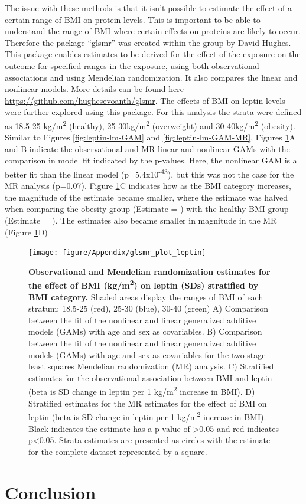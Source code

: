 \documentclass[11pt,twoside]{bristolthesis}
\begin{document}
The issue with these methods is that it isn't possible to estimate the effect of a certain range of BMI on protein levels. This is important to be able to understand the range of BMI where certain effects on proteins are likely to occur. Therefore the package ``glsmr'' was created within the group by David Hughes. This package enables estimates to be derived for the effect of the exposure on the outcome for specified ranges in the exposure, using both observational associations and using Mendelian randomization. It also compares the linear and nonlinear models. More details can be found here \url{https://github.com/hughesevoanth/glsmr}. The effects of BMI on leptin levels were further explored using this package. For this analysis the strata were defined as 18.5-25 kg/m\textsuperscript{2} (healthy), 25-30kg/m\textsuperscript{2} (overweight) and 30-40kg/m\textsuperscript{2} (obesity). Similar to Figures \ref{fig:leptin-lm-GAM} and \ref{fig:leptin-lm-GAM-MR}, Figures \ref{fig:leptin-glsmr}A and B indicate the observational and MR linear and nonlinear GAMs with the comparison in model fit indicated by the p-values. Here, the nonlinear GAM is a better fit than the linear model (p=5.4x10\textsuperscript{-43}), but this was not the case for the MR analysis (p=0.07). Figure \ref{fig:leptin-glsmr}C indicates how as the BMI category increases, the magnitude of the estimate became smaller, where the estimate was halved when comparing the obesity group (Estimate = ) with the healthy BMI group (Estimate = ). The estimates also became smaller in magnitude in the MR (Figure \ref{fig:leptin-glsmr}D)



\begin{figure}
\texttt{[image: figure/Appendix/glsmr\_plot\_leptin]} \caption[Observational and Mendelian randomization estimates for the effect of BMI on leptin stratified by BMI category.]{\textbf{Observational and Mendelian randomization estimates for the effect of BMI (kg/m\textsuperscript{2}) on leptin (SDs) stratified by BMI category.} Shaded areas display the ranges of BMI of each stratum: 18.5-25 (red), 25-30 (blue), 30-40 (green) A) Comparison between the fit of the nonlinear and linear generalized additive models (GAMs) with age and sex as covariables. B) Comparison between the fit of the nonlinear and linear generalized additive models (GAMs) with age and sex as covariables for the two stage least squares Mendelian randomization (MR) analysis. C) Stratified estimates for the observational association between BMI and leptin (beta is SD change in leptin per 1 kg/m\textsuperscript{2} increase in BMI). D) Stratified estimates for the MR estimates for the effect of BMI on leptin (beta is SD change in leptin per 1 kg/m\textsuperscript{2} increase in BMI). Black indicates the estimate has a p value of \textgreater0.05 and red indicates p\textless0.05. Strata estimates are presented as circles with the estimate for the complete dataset represented by a square.}\label{fig:leptin-glsmr}
\end{figure}
\hypertarget{conclusion}{%
\section{Conclusion}\label{conclusion}}
\end{document}
